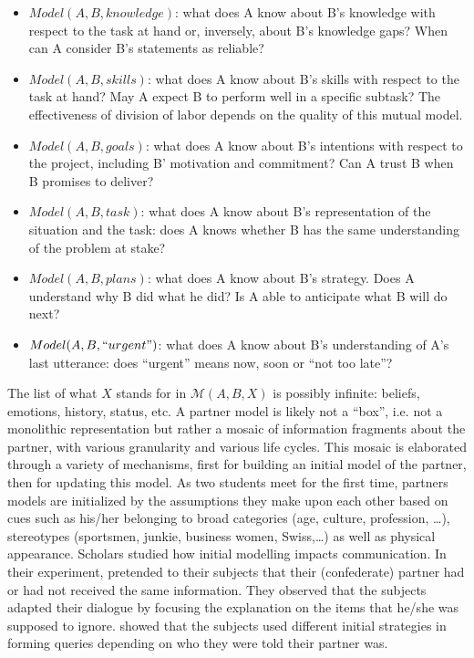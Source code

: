 \documentclass[natbib]{svjour3}
\newcommand{\ie}{i.e.\xspace}
\newcommand{\A}{A\xspace}
\newcommand{\B}{B\xspace}
\newcommand{\model}[3]{{$\mathcal{M}(#1, #2, #3)$}}
\begin{document}
\begin{itemize}

    \item $Model(A,B, knowledge)$: what does \A know about \B's knowledge with
        respect to the task at hand or, inversely, about \B's knowledge gaps?
        When can \A consider \B's statements as reliable? 

    \item $Model(A,B, skills)$: what does \A know about \B's skills with respect to
        the task at hand? May \A expect \B to perform well in a specific subtask?
        The effectiveness of division of labor depends on the quality of this
        mutual model. 

    \item $Model(A,B, goals)$: what does \A know about \B's intentions with respect
        to the project, including \B' motivation and commitment? Can \A trust
        \B
        when \B promises to deliver? 

    \item $Model(A,B, task)$: what does \A know about \B's representation of the
        situation and the task: does \A knows whether \B has the same
        understanding of the problem at stake? 

    \item $Model(A,B, plans)$: what does \A know about \B's strategy. Does A
        understand why \B did what he did? Is \A able to anticipate what \B will do
        next? 

    \item $Model(A,B, ``urgent")$: what does \A know about \B's understanding of \A's
        last utterance: does ``urgent'' means now, soon or ``not too late''?

\end{itemize}

The list of what $X$ stands for in \model{A}{B}{X} is possibly infinite:
beliefs, emotions, history, status, etc. A partner model is likely not a
``box'', \ie not a monolithic representation but rather a mosaic of information
fragments about the partner, with various granularity and various life cycles.
This mosaic is elaborated through a variety of mechanisms, first for building an
initial model of the partner, then for updating this model. As two students meet
for the first time, partners models are initialized by the assumptions they make
upon each other based on cues such as his/her belonging to broad categories
(age, culture, profession, \ldots), stereotypes (sportsmen, junkie, business
women, Swiss,\ldots) as well as physical appearance. Scholars studied how
initial modelling impacts communication. In their experiment,
\citet{slugoski1993attribution} pretended to their subjects that their
(confederate) partner had or had not received the same information. They
observed that the subjects adapted their dialogue by focusing the explanation on
the items that he/she was supposed to ignore.  \citet{brennan1991conversation}
showed that the subjects used different initial strategies in forming queries
depending on who they were told their partner was.  
\end{document}
